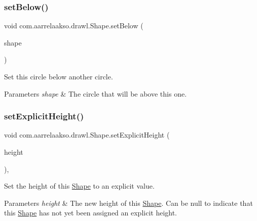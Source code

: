 \subsubsection{\texorpdfstring{set\+Below()}{setBelow()}}
{\footnotesize\ttfamily void com.\+aarrelaakso.\+drawl.\+Shape.\+set\+Below (\begin{DoxyParamCaption}\item[{\hyperlink{classcom_1_1aarrelaakso_1_1drawl_1_1_shape}{Shape}}]{shape }\end{DoxyParamCaption})\hspace{0.3cm}{\ttfamily [inherited]}}

Set this circle below another circle.


\begin{DoxyParams}{Parameters}
{\em shape} & The circle that will be above this one. \\
\hline
\end{DoxyParams}
\mbox{\label{classcom_1_1aarrelaakso_1_1drawl_1_1_shape_a37e0c4b85c07c4c87a24609ae1cb50a5}} 
\subsubsection{\texorpdfstring{set\+Explicit\+Height()}{setExplicitHeight()}}
{\footnotesize\ttfamily void com.\+aarrelaakso.\+drawl.\+Shape.\+set\+Explicit\+Height (\begin{DoxyParamCaption}\item[{@Nullable \hyperlink{classcom_1_1aarrelaakso_1_1drawl_1_1_sisu_big_decimal}{Sisu\+Big\+Decimal}}]{height }\end{DoxyParamCaption})\hspace{0.3cm}{\ttfamily [protected]}, {\ttfamily [inherited]}}

Set the height of this \hyperlink{classcom_1_1aarrelaakso_1_1drawl_1_1_shape}{Shape} to an explicit value. 


\begin{DoxyParams}{Parameters}
{\em height} & The new height of this \hyperlink{classcom_1_1aarrelaakso_1_1drawl_1_1_shape}{Shape}. Can be {\ttfamily null} to indicate that this \hyperlink{classcom_1_1aarrelaakso_1_1drawl_1_1_shape}{Shape} has not yet been assigned an explicit height. \\
\hline
\end{DoxyParams}
\mbox{\label{classcom_1_1aarrelaakso_1_1drawl_1_1_shape_a976c002388892d227697cab39c1e5724}} 
